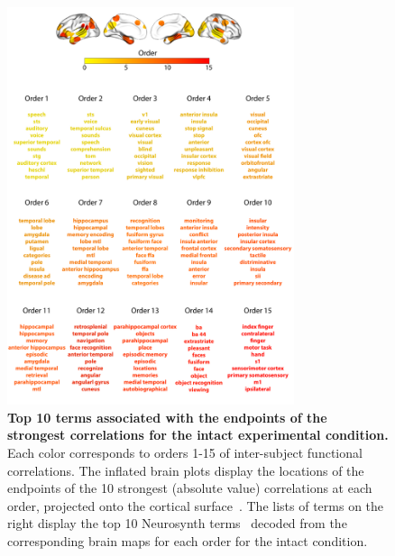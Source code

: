 \documentclass{article}
\begin{document}
\begin{figure}[p!]
\centering
\includegraphics[width=0.75\textwidth]{figs/supp_15_intact}
\caption{\textbf{Top 10 terms associated with the endpoints of the
      strongest correlations for the intact experimental condition.}  Each color corresponds to orders 1-15 of
    inter-subject functional correlations. The inflated brain plots
    display the locations of the endpoints of the 10 strongest
    (absolute value) correlations at each order, projected onto the
    cortical surface~\citep{CombEtal19}.  The lists of terms on the
    right display the top 10 Neurosynth terms~\citep{RubiEtal17}
    decoded from the corresponding brain maps for each order for the intact condition.}
\label{fig:intact}
\end{figure}
\end{document}
